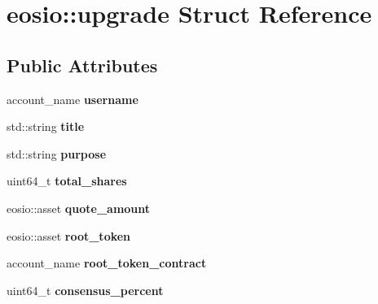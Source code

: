 \hypertarget{structeosio_1_1upgrade}{}\section{eosio\+:\+:upgrade Struct Reference}
\label{structeosio_1_1upgrade}
\subsection*{Public Attributes}
\begin{DoxyCompactItemize}
\item 
\mbox{\label{structeosio_1_1upgrade_aca34ed7f60c0082ccdd9281ab9df5e05}} 
account\+\_\+name {\bfseries username}
\item 
\mbox{\label{structeosio_1_1upgrade_a1fdfe36f9b23708bda09a1e2cf4ac5a9}} 
std\+::string {\bfseries title}
\item 
\mbox{\label{structeosio_1_1upgrade_ab4d5ffff08774557a95aa7c6e23723e5}} 
std\+::string {\bfseries purpose}
\item 
\mbox{\label{structeosio_1_1upgrade_a69a8b76a33fa3619b2114885cd16115c}} 
uint64\+\_\+t {\bfseries total\+\_\+shares}
\item 
\mbox{\label{structeosio_1_1upgrade_a5131e0eaa3eabcd228519cef32c39075}} 
eosio\+::asset {\bfseries quote\+\_\+amount}
\item 
\mbox{\label{structeosio_1_1upgrade_ae40e9f70ed8d453b4892960859cb6864}} 
eosio\+::asset {\bfseries root\+\_\+token}
\item 
\mbox{\label{structeosio_1_1upgrade_a5d79a63e14844937dab45237e4f0fcd9}} 
account\+\_\+name {\bfseries root\+\_\+token\+\_\+contract}
\item 
\mbox{\label{structeosio_1_1upgrade_ab286ffcaa3a70d42699bb0b869b2a458}} 
uint64\+\_\+t {\bfseries consensus\+\_\+percent}
\item 
\mbox{\label{structeosio_1_1upgrade_ae5f0ac6cc80361aa1f7309adbcfce9d8}} 

\end{DoxyCompactItemize}
